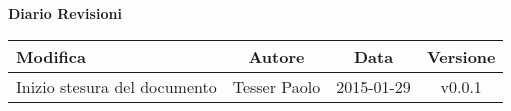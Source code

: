 %

\begin{center}
\begin{small}
	\textbf{\huge Diario Revisioni}
	\vspace{0.5cm}
	\begin{longtable}{|p{6cm}|c|c|c|}
		\hline
		\textbf{Modifica} & \textbf{Autore} & \textbf{Data} & \textbf{Versione} \\
		\hline
		Inizio stesura del documento & Tesser Paolo & 2015-01-29 & v0.0.1 \\
		\hline
	\end{longtable}

\end{small}
\end{center}